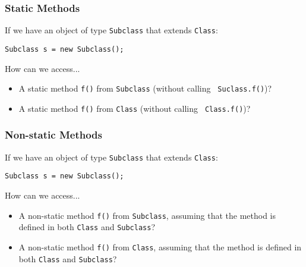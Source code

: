 \documentclass[9pt]{beamer}
\begin{document}
\begin{frame}[fragile]
  \frametitle{Static Methods}
  If we have an object of type {\tt Subclass} that extends {\tt Class}:

  \begin{lstlisting}
Subclass s = new Subclass();
  \end{lstlisting}

  How can we access...
  \begin{itemize}
    \item
      A static method {\tt f()} from {\tt Subclass} (without calling {\tt
      Suclass.f()})?

    \item
      A static method {\tt f()} from {\tt Class} (without calling {\tt
      Class.f()})?


 \end{itemize}
\end{frame}


\begin{frame}[fragile]
  \frametitle{Non-static Methods}
  If we have an object of type {\tt Subclass} that extends {\tt Class}:

  \begin{lstlisting}
Subclass s = new Subclass();
  \end{lstlisting}

  How can we access...
  \begin{itemize}
    \item
      A non-static method {\tt f()} from {\tt Subclass}, assuming that the
      method is defined in both {\tt Class} and {\tt Subclass}?

    \item
      A non-static method {\tt f()} from {\tt Class}, assuming that the
      method is defined in both {\tt Class} and {\tt Subclass}?

  \end{itemize}
\end{frame}
\end{document}

